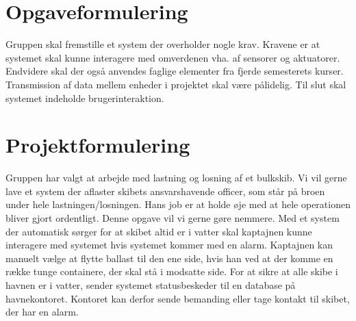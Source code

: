 \chapter{Opgaveformulering}
\label{ch:Opgaveformulering}
Gruppen skal fremstille et system der overholder nogle krav. Kravene er at systemet skal kunne interagere med omverdenen vha. af sensorer og aktuatorer. Endvidere skal der også anvendes faglige elementer fra fjerde semesterets kurser. Transmission af data mellem enheder i projektet skal være pålidelig. Til slut skal systemet indeholde brugerinteraktion. 

\chapter{Projektformulering}
\label{ch:Projektformulering}
Gruppen har valgt at arbejde med lastning og losning af et bulkskib. Vi vil gerne lave et system der aflaster skibets ansvarshavende officer, som står på broen under hele lastningen/losningen. Hans job er at holde øje med at hele operationen bliver gjort ordentligt. Denne opgave vil vi gerne gøre nemmere. Med et system der automatisk sørger for at skibet altid er i vatter skal kaptajnen kunne interagere med systemet hvis systemet kommer med en alarm. Kaptajnen kan manuelt vælge at flytte ballast til den ene side, hvis han ved at der komme en række tunge containere, der skal stå i modsatte side. For at sikre at alle skibe i havnen er i vatter, sender systemet statusbeskeder til en database på havnekontoret. Kontoret kan derfor sende bemanding eller tage kontakt til skibet, der har en alarm.